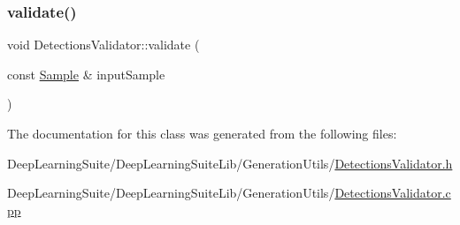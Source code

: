 \subsubsection{\texorpdfstring{validate()}{validate()}\hspace{0.1cm}{\footnotesize\ttfamily [2/2]}}
{\footnotesize\ttfamily void Detections\+Validator\+::validate (\begin{DoxyParamCaption}\item[{const \hyperlink{struct_sample}{Sample} \&}]{input\+Sample }\end{DoxyParamCaption})}



The documentation for this class was generated from the following files\+:\begin{DoxyCompactItemize}
\item 
Deep\+Learning\+Suite/\+Deep\+Learning\+Suite\+Lib/\+Generation\+Utils/\hyperlink{_detections_validator_8h}{Detections\+Validator.\+h}\item 
Deep\+Learning\+Suite/\+Deep\+Learning\+Suite\+Lib/\+Generation\+Utils/\hyperlink{_detections_validator_8cpp}{Detections\+Validator.\+cpp}\end{DoxyCompactItemize}
